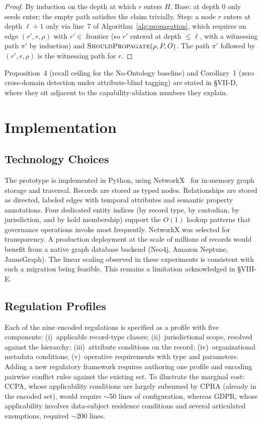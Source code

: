\documentclass{ieeeaccess}
\begin{document}
\begin{proof}
By induction on the depth at which $r$ enters $H$. Base: at depth 0 only seeds enter; the empty path satisfies the claim trivially. Step: a node $r$ enters at depth $\ell + 1$ only via line~7 of Algorithm~\ref{alg:propagation}, which requires an edge $(r', r, \rho)$ with $r' \in$ frontier (so $r'$ entered at depth $\leq \ell$, with a witnessing path $\pi'$ by induction) and $\textsc{ShouldPropagate}(\rho, P, O)$. The path $\pi'$ followed by $(r', r, \rho)$ is the witnessing path for $r$.
\end{proof}

Proposition~4 (recall ceiling for the No-Ontology baseline) and Corollary~1 (zero cross-domain detection under attribute-blind tagging) are stated in §VII-D, where they sit adjacent to the capability-ablation numbers they explain.

\section{Implementation}

\subsection{Technology Choices}

The prototype is implemented in Python, using NetworkX~\cite{networkx} for in-memory graph storage and traversal. Records are stored as typed nodes. Relationships are stored as directed, labeled edges with temporal attributes and semantic property annotations. Four dedicated entity indices (by record type, by custodian, by jurisdiction, and by hold membership) support the $O(1)$ lookup patterns that governance operations invoke most frequently. NetworkX was selected for transparency. A production deployment at the scale of millions of records would benefit from a native graph database backend (Neo4j, Amazon Neptune, JanusGraph). The linear scaling observed in these experiments is consistent with such a migration being feasible. This remains a limitation acknowledged in §VIII-E.

\subsection{Regulation Profiles}

Each of the nine encoded regulations is specified as a profile with five components: (i)~applicable record-type classes; (ii)~jurisdictional scope, resolved against the hierarchy; (iii)~attribute conditions on the record; (iv)~organizational metadata conditions; (v)~operative requirements with type and parameters. Adding a new regulatory framework requires authoring one profile and encoding pairwise conflict rules against the existing set. To illustrate the marginal cost: CCPA, whose applicability conditions are largely subsumed by CPRA (already in the encoded set), would require $\sim$50 lines of configuration, whereas GDPR, whose applicability involves data-subject residence conditions and several articulated exemptions, required $\sim$200 lines.
\end{document}
